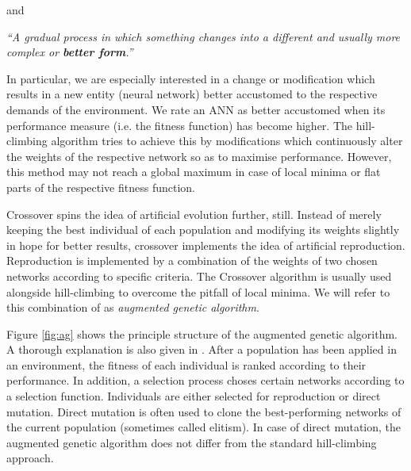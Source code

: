 \documentclass[10pt,a4paper,DIV=11]{scrreprt}
\begin{document}
and

\begin{center}
\textit{“A gradual process in which something changes into a different and usually more complex or \textbf{better form}.”}\\ 
\end{center}

In particular, we are especially interested in a change or modification which results in a new entity (neural network) better accustomed to the 
respective demands of the environment. We rate an ANN as better accustomed when its performance measure (i.e. the fitness function) has become 
higher. The hill-climbing algorithm tries to achieve this by modifications which continuously alter the weights of the respective network so 
as to maximise performance. However, this method may not reach a global maximum in case of local minima or flat parts of the respective fitness 
function.

Crossover spins the idea of artificial evolution further, still. Instead of merely keeping the best individual of each population and modifying 
its weights slightly in hope for better results, crossover implements the idea of artificial reproduction. Reproduction is implemented by a 
combination of the weights of two chosen networks according to specific criteria. The Crossover algorithm is usually used alongside hill-climbing 
to overcome the pitfall of local minima. We will refer to this combination of as \textit{augmented genetic algorithm}.

Figure \ref{fig:ag} shows the principle structure of the augmented genetic algorithm. A thorough explanation is also given in \cite{CROSSOVER}.
After a population has been applied in an environment, the fitness of each individual is ranked according to their performance. 
In addition, a selection process choses certain networks according to a selection function. Individuals are either selected for reproduction 
or direct mutation. Direct mutation is often used to clone the best-performing networks of the current population (sometimes called elitism). 
In case of direct mutation, the augmented genetic algorithm does not differ from the standard hill-climbing approach.
\end{document}
